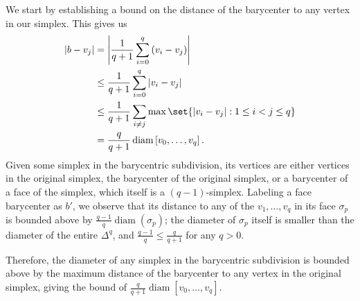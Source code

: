 \documentclass[10pt]{mypackage}
\begin{document}
\begin{solution}
  We start by establishing a bound on the distance of the barycenter to any vertex in our simplex. This gives us
  \begin{align*}
    \left\vert b-v_j \right\vert &= \left\vert \frac{1}{q+1} \sum_{i=0}^{q}\left( v_i-v_j \right) \right\vert\\
                                 &\leq \frac{1}{q+1} \sum_{i=0}^{q} \left\vert v_i-v_j \right\vert\\
                                 &\leq \frac{1}{q+1}\sum_{i\neq j} \max\set{\left\vert v_i-v_j \right\vert : 1\leq i < j \leq q}\\
                                 &= \frac{q}{q+1}\operatorname{diam}\left[ v_0,\dots,v_q \right].
  \end{align*}
  Given some simplex in the barycentric subdivision, its vertices are either vertices in the original simplex, the barycenter of the original simplex, or a barycenter of a face of the simplex, which itself is a $\left( q-1 \right)$-simplex. Labeling a face barycenter as $b'$, we observe that its distance to any of the $v_1,\dots,v_q$ in its face $\sigma_p$ is bounded above by $\frac{q-1}{q}\operatorname{diam}\left( \sigma_p \right)$; the diameter of $\sigma_p$ itself is smaller than the diameter of the entire $\Delta^q$, and $\frac{q-1}{q}\leq \frac{q}{q+1}$ for any $q > 0$. 

  Therefore, the diameter of any simplex in the barycentric subdivision is bounded above by the maximum distance of the barycenter to any vertex in the original simplex, giving the bound of $\frac{q}{q+1}\operatorname{diam}\left[ v_0,\dots,v_q \right]$.
\end{solution}
\end{document}
